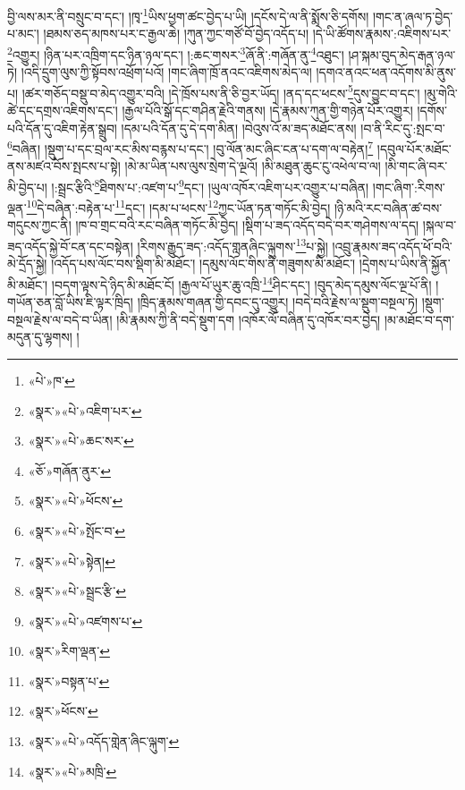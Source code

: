 བྱི་ལས་མར་ནི་བསྲུང་བ་དང་། །ཁྭ་\footnote{«པེ་»ཁ་}ཡིས་ཕྱག་ཚང་བྱེད་པ་ཡི། །དངོས་དེ་ལ་ནི་སྨོས་ཅི་དགོས། །གང་ན་ཞལ་ཏ་བྱེད་པ་མང་། །ཐམས་ཅད་མཁས་པར་ང་རྒྱལ་ཆེ། །ཀུན་ཀྱང་གཙོ་བོ་བྱེད་འདོད་པ། །དེ་ཡི་ཚོགས་རྣམས་:འཇིགས་པར་\footnote{«སྣར་»«པེ་»འཇིག་པར་}འགྱུར། །ཉིན་པར་འཁྲིག་དང་ཉིན་ཉལ་དང་། །:ཆང་གསར་\footnote{«སྣར་»«པེ་»ཆང་སར་}ཞོ་ནི་:གཞོན་ནུ་\footnote{«ཅོ་»གཞོན་ནུར་}འཐུང་། །ཤ་སྐམ་བུད་མེད་རྒན་ཉལ་ཏེ། །འདི་དྲུག་ལུས་ཀྱི་སྟོབས་འཕྲོག་པའོ། །གང་ཞིག་ཁྲོ་ནའང་འཇིགས་མེད་ལ། །དགའ་ནའང་ཕན་འདོགས་མི་ནུས་པ། །ཚར་གཅོད་བསྡུ་བ་མེད་འགྱུར་བའི། །དེ་ཁྲོས་པས་ནི་ཅི་བྱར་ཡོད། །ནད་དང་ཕངས་\footnote{«སྣར་»«པེ་»ཕོངས་}དུས་བྱུང་བ་དང་། །མུ་གེའི་ཚེ་དང་དགྲས་འཇིགས་དང་། །རྒྱལ་པོའི་སྒོ་དང་གཤིན་རྗེའི་གནས། །དེ་རྣམས་ཀུན་གྱི་གཉེན་པོར་འགྱུར། །དགོས་པའི་དོན་དུ་འཇིག་རྟེན་སྒྲུབ། །དམ་པའི་དོན་དུ་དེ་དག་མིན། །བེའུས་འོ་མ་ཟད་མཐོང་ནས། །བ་ནི་རིང་དུ་:སྤང་བ་\footnote{«སྣར་»«པེ་»སྤོང་བ་}བཞིན། །སྡུག་པ་དང་བྲལ་རང་མིས་བརྙས་པ་དང་། །བུ་ལོན་མང་ཞིང་ངན་པ་དག་ལ་བརྟེན།\footnote{«སྣར་»«པེ་»སྟེན།} །དབུལ་པོར་མཐོང་ནས་མཛའ་བོས་སྤངས་པ་སྟེ། །མེ་མ་ཡིན་པས་ལུས་སྲེག་དེ་ལྔའོ། །མི་མཐུན་ཆུང་ངུ་འཕེལ་བ་ལ། །མི་གང་ཞི་བར་མི་བྱེད་པ། །:སྦྲང་རྩིའི་\footnote{«སྣར་»«པེ་»སྦྲང་རྩི་}ཐིགས་པ་:འཛག་པ་\footnote{«སྣར་»«པེ་»འཛགས་པ་}དང་། །ཡུལ་འཁོར་འཇིག་པར་འགྱུར་པ་བཞིན། །གང་ཞིག་:རིགས་ལྡན་\footnote{«སྣར་»རིག་ལྡན་}དེ་བཞིན་:བརྟེན་པ་\footnote{«སྣར་»བསྟན་པ་}དང་། །དམ་པ་ཕངས་\footnote{«སྣར་»ཕོངས་}ཀྱང་ཡོན་ཏན་གཏོང་མི་བྱེད། །ཉི་མའི་རང་བཞིན་ཚ་བས་གདུངས་ཀྱང་ནི། །ཁ་བ་གྲང་བའི་རང་བཞིན་གཏོང་མི་བྱེད། །སྡིག་པ་ཟད་འདོད་བདེ་བར་གཤེགས་ལ་དད། །སྐལ་བ་ཟད་འདོད་སྐྱེ་བོ་ངན་དང་བསྟེན། །རིགས་རྒྱུད་ཟད་:འདོད་གླནཞིང་ལྐུགས་\footnote{«སྣར་»«པེ་»འདོད་གླེན་ཞིང་ལྐུག་}པ་སྐྱེ། །འབྲུ་རྣམས་ཟད་འདོད་ཕོ་བའི་མེ་དྲོད་སྐྱེ། །འདོད་པས་ལོང་བས་སྡིག་མི་མཐོང་། །དམུས་ལོང་གིས་ནི་གཟུགས་མི་མཐོང་། །དྲེགས་པ་ཡིས་ནི་སྐྱོན་མི་མཐོང་། །བདག་ལྟས་དེ་ཉིད་མི་མཐོང་ངོ། །རྒྱལ་པོ་ཡུར་ཆུ་འཁྲི་\footnote{«སྣར་»«པེ་»མཁྲི་}ཤིང་དང་། །བུད་མེད་དམུས་ལོང་ལྔ་པོ་ནི། །གཡོན་ཅན་བློ་ཡིས་ཇི་ལྟར་ཁྲིད། །ཁྲིད་རྣམས་གཞན་གྱི་དབང་དུ་འགྱུར། །བདེ་བའི་རྗེས་ལ་སྡུག་བསྔལ་ཏེ། །སྡུག་བསྔལ་རྗེས་ལ་བདེ་བ་ཡིན། །མི་རྣམས་ཀྱི་ནི་བདེ་སྡུག་དག །འཁོར་ལོ་བཞིན་དུ་འཁོར་བར་བྱེད། །མ་མཐོང་བ་དག་མདུན་དུ་ལྷགས། །
